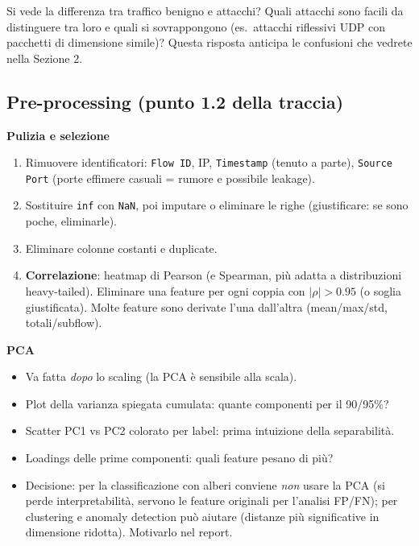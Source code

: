 \begin{domande}
Si vede la differenza tra traffico benigno e attacchi? Quali attacchi sono
facili da distinguere tra loro e quali si sovrappongono (es.\ attacchi
riflessivi UDP con pacchetti di dimensione simile)? Questa risposta anticipa
le confusioni che vedrete nella Sezione 2.
\end{domande}

\subsection{Pre-processing (punto 1.2 della traccia)}
\begin{strategia}
\textbf{Pulizia e selezione}
\begin{enumerate}
  \item Rimuovere identificatori: \texttt{Flow ID}, IP, \texttt{Timestamp}
        (tenuto a parte), \texttt{Source Port} (porte effimere casuali =
        rumore e possibile leakage).
  \item Sostituire \texttt{inf} con \texttt{NaN}, poi imputare o eliminare le
        righe (giustificare: se sono poche, eliminarle).
  \item Eliminare colonne costanti e duplicate.
  \item \textbf{Correlazione}: heatmap di Pearson (e Spearman, più adatta a
        distribuzioni heavy-tailed). Eliminare una feature per ogni coppia con
        $|\rho|>0.95$ (o soglia giustificata). Molte feature sono derivate
        l'una dall'altra (mean/max/std, totali/subflow).
\end{enumerate}

\textbf{PCA}
\begin{itemize}
  \item Va fatta \emph{dopo} lo scaling (la PCA è sensibile alla scala).
  \item Plot della varianza spiegata cumulata: quante componenti per il
        90/95\%?
  \item Scatter PC1 vs PC2 colorato per label: prima intuizione della
        separabilità.
  \item Loadings delle prime componenti: quali feature pesano di più?
  \item Decisione: per la classificazione con alberi conviene \emph{non}
        usare la PCA (si perde interpretabilità, servono le feature originali
        per l'analisi FP/FN); per clustering e anomaly detection può aiutare
        (distanze più significative in dimensione ridotta). Motivarlo nel
        report.
\end{itemize}


\end{strategia}
